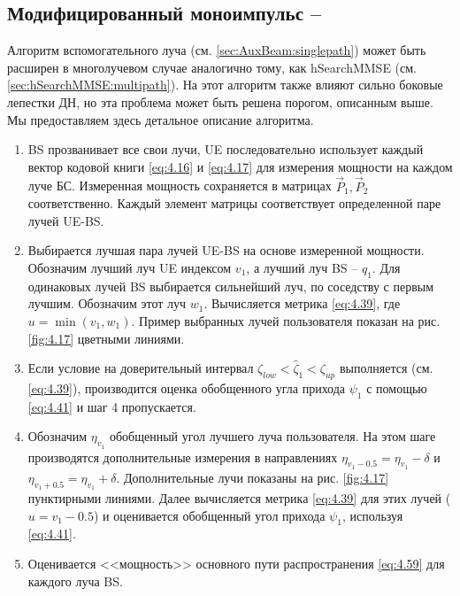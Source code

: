 \subsection[Модифицированный моноимпульс]{Модифицированный моноимпульс -- \AuxBeam{}}
\label{sec:AuxBeam:multipath}


Алгоритм вспомогательного луча (см. \ref{sec:AuxBeam:singlepath})
может быть расширен в многолучевом
случае аналогично тому, как hSearchMMSE (см. \ref{sec:hSearchMMSE:multipath}).
На этот алгоритм также влияют сильно боковые лепестки ДН, но эта проблема
может быть решена порогом, описанным выше. Мы предоставляем здесь
детальное описание алгоритма.

\begin{enumerate}[label=\textbf{Шаг \arabic*:}]
    \item BS прозванивает все свои лучи, UE последовательно использует
          каждый вектор кодовой книги \eqref{eq:4.16} и \eqref{eq:4.17} для
          измерения мощности на каждом луче БС. Измеренная мощность сохраняется
          в матрицах $\vec P_1, \vec P_2$ соответственно. Каждый элемент матрицы соответствует
          определенной паре лучей UE-BS.
    \item Выбирается лучшая пара лучей UE-BS на основе измеренной мощности.
          Обозначим лучший луч UE индексом $v_1$, а лучший луч BS -- $q_1$.
          Для одинаковых лучей BS выбирается сильнейший луч, по соседству с первым лучшим.
          Обозначим этот луч $w_1$. Вычисляется метрика \eqref{eq:4.39}, где $u=\min(v_1,w_1)$.
          Пример выбранных лучей пользователя показан на рис. \ref{fig:4.17} цветными линиями.
    \item Если условие на доверительный интервал $\zeta_{low} < \hat \zeta_1 < \zeta_{up}$
          выполняется (см. \eqref{eq:4.39}), производится оценка обобщенного угла прихода
          $\psi_1$ с помощью \eqref{eq:4.41} и шаг 4 пропускается.
    \item Обозначим $\eta_{v_1}$ обобщенный угол лучшего луча пользователя.
          На этом шаге производятся дополнительные измерения в направлениях
          $\eta_{v_1 - 0.5} = \eta_{v_1} - \delta$ и
          $\eta_{v_1 + 0.5} = \eta_{v_1} + \delta$. Дополнительные лучи
          показаны на рис. \ref{fig:4.17} пунктирными линиями. Далее вычисляется
          метрика \eqref{eq:4.39} для этих лучей ($u=v_1 - 0.5$) и оценивается
          обобщенный угол прихода $\psi_1$, используя \eqref{eq:4.41}.
    \item Оценивается <<мощность>> основного пути распространения \eqref{eq:4.59} для каждого луча BS.

\end{enumerate}
